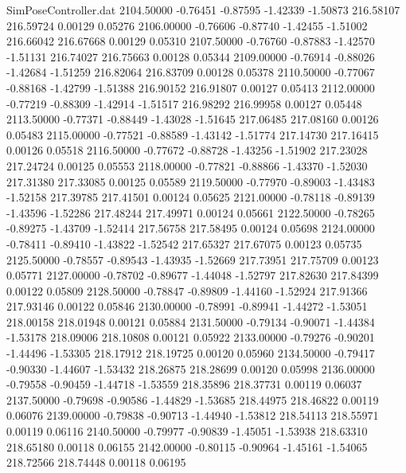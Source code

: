 \begin{filecontents}{SimPoseController.dat}
2104.50000   -0.76451   -0.87595    -1.42339   -1.50873  216.58107  216.59724    0.00129    0.05276
2106.00000   -0.76606   -0.87740    -1.42455   -1.51002  216.66042  216.67668    0.00129    0.05310
2107.50000   -0.76760   -0.87883    -1.42570   -1.51131  216.74027  216.75663    0.00128    0.05344
2109.00000   -0.76914   -0.88026    -1.42684   -1.51259  216.82064  216.83709    0.00128    0.05378
2110.50000   -0.77067   -0.88168    -1.42799   -1.51388  216.90152  216.91807    0.00127    0.05413
2112.00000   -0.77219   -0.88309    -1.42914   -1.51517  216.98292  216.99958    0.00127    0.05448
2113.50000   -0.77371   -0.88449    -1.43028   -1.51645  217.06485  217.08160    0.00126    0.05483
2115.00000   -0.77521   -0.88589    -1.43142   -1.51774  217.14730  217.16415    0.00126    0.05518
2116.50000   -0.77672   -0.88728    -1.43256   -1.51902  217.23028  217.24724    0.00125    0.05553
2118.00000   -0.77821   -0.88866    -1.43370   -1.52030  217.31380  217.33085    0.00125    0.05589
2119.50000   -0.77970   -0.89003    -1.43483   -1.52158  217.39785  217.41501    0.00124    0.05625
2121.00000   -0.78118   -0.89139    -1.43596   -1.52286  217.48244  217.49971    0.00124    0.05661
2122.50000   -0.78265   -0.89275    -1.43709   -1.52414  217.56758  217.58495    0.00124    0.05698
2124.00000   -0.78411   -0.89410    -1.43822   -1.52542  217.65327  217.67075    0.00123    0.05735
2125.50000   -0.78557   -0.89543    -1.43935   -1.52669  217.73951  217.75709    0.00123    0.05771
2127.00000   -0.78702   -0.89677    -1.44048   -1.52797  217.82630  217.84399    0.00122    0.05809
2128.50000   -0.78847   -0.89809    -1.44160   -1.52924  217.91366  217.93146    0.00122    0.05846
2130.00000   -0.78991   -0.89941    -1.44272   -1.53051  218.00158  218.01948    0.00121    0.05884
2131.50000   -0.79134   -0.90071    -1.44384   -1.53178  218.09006  218.10808    0.00121    0.05922
2133.00000   -0.79276   -0.90201    -1.44496   -1.53305  218.17912  218.19725    0.00120    0.05960
2134.50000   -0.79417   -0.90330    -1.44607   -1.53432  218.26875  218.28699    0.00120    0.05998
2136.00000   -0.79558   -0.90459    -1.44718   -1.53559  218.35896  218.37731    0.00119    0.06037
2137.50000   -0.79698   -0.90586    -1.44829   -1.53685  218.44975  218.46822    0.00119    0.06076
2139.00000   -0.79838   -0.90713    -1.44940   -1.53812  218.54113  218.55971    0.00119    0.06116
2140.50000   -0.79977   -0.90839    -1.45051   -1.53938  218.63310  218.65180    0.00118    0.06155
2142.00000   -0.80115   -0.90964    -1.45161   -1.54065  218.72566  218.74448    0.00118    0.06195

\end{filecontents}
